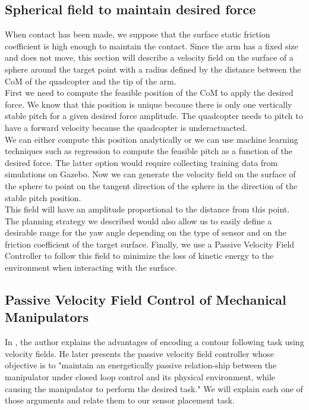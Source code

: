 \subsection{Spherical field to maintain desired force }
When contact has been made, we suppose that the surface static friction coefficient is high enough to maintain the contact.
Since the arm has a fixed size and does not move, this section will describe a velocity field on the surface of a sphere around the target point with a radius defined by the distance between the CoM of the quadcopter and the tip of the arm.\\
First we need to compute the feasible position of the CoM to apply the desired force. 
We know that this position is unique because there is only one vertically stable pitch for a given desired force amplitude. The quadcopter needs to pitch to have a forward velocity because the quadcopter is underactuacted.\\
We can either compute this position analytically or we can use machine learning techniques such as regression to compute the feasible pitch as a function of the desired force. The latter option would require collecting training data from simulations on Gazebo. 
Now we can generate the velocity field on the surface of the sphere to point on the tangent direction of the sphere in the direction of the stable pitch position. \\
This field will have an amplitude proportional to the distance from this point.
The planning strategy we described would also allow us to easily define a desirable range for the yaw angle depending on the type of sensor and on the friction coefficient of the target surface.
Finally, we use a Passive Velocity Field Controller \cite{li1999passive} to follow this field to minimize the loss of kinetic energy to the environment when interacting with the surface.

\subsection{Passive Velocity Field Control of Mechanical Manipulators}
In \cite{li1999passive}, the author explains the advantages of encoding a contour following task using velocity fields. 
He later presents the passive velocity field controller whose objective is to "maintain an energetically passive relation-ship between the manipulator under closed loop control and
its physical environment, while causing the manipulator to perform the desired task." 
We will explain each one of those arguments and relate them to our sensor placement task.
